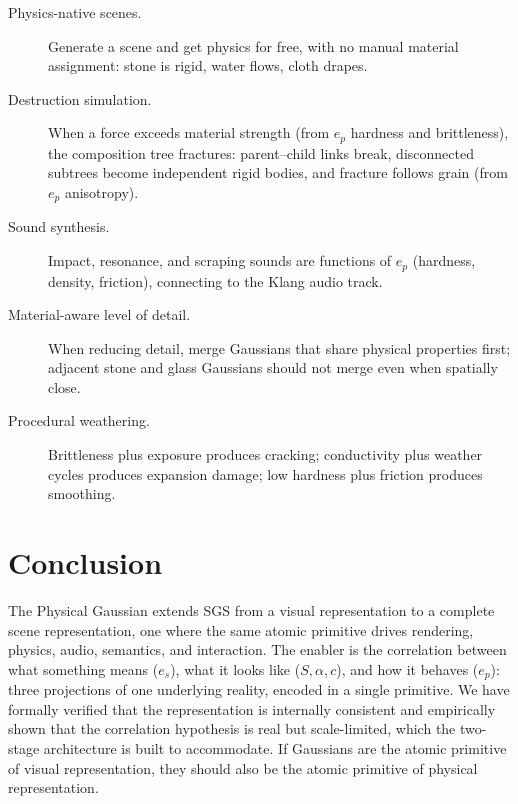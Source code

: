 \documentclass[twoside,11pt]{article}
\begin{document}
\begin{description}
\item[Physics-native scenes.] Generate a scene and get physics for free, with no manual material assignment: stone is rigid, water flows, cloth drapes.
\item[Destruction simulation.] When a force exceeds material strength (from $e_p$ hardness and brittleness), the composition tree fractures: parent--child links break, disconnected subtrees become independent rigid bodies, and fracture follows grain (from $e_p$ anisotropy).
\item[Sound synthesis.] Impact, resonance, and scraping sounds are functions of $e_p$ (hardness, density, friction), connecting to the Klang audio track.
\item[Material-aware level of detail.] When reducing detail, merge Gaussians that share physical properties first; adjacent stone and glass Gaussians should not merge even when spatially close.
\item[Procedural weathering.] Brittleness plus exposure produces cracking; conductivity plus weather cycles produces expansion damage; low hardness plus friction produces smoothing.
\end{description}

\section{Conclusion}

The Physical Gaussian extends SGS from a visual representation to a complete scene representation, one where the same atomic primitive drives rendering, physics, audio, semantics, and interaction. The enabler is the correlation between what something means ($e_s$), what it looks like ($S, \alpha, c$), and how it behaves ($e_p$): three projections of one underlying reality, encoded in a single primitive. We have formally verified that the representation is internally consistent and empirically shown that the correlation hypothesis is real but scale-limited, which the two-stage architecture is built to accommodate. If Gaussians are the atomic primitive of visual representation, they should also be the atomic primitive of physical representation.

\end{document}
